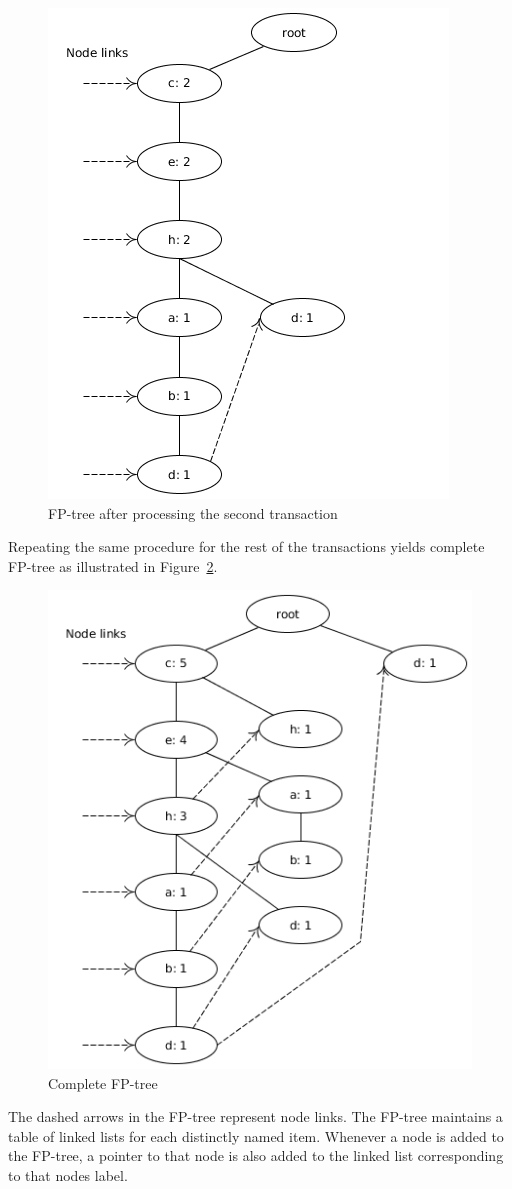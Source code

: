\begin{figure}[!htbp]
	\centering
	\includegraphics[scale=0.5]{fp-tree-example/fp-tree-p2.png}
	\caption{FP-tree after processing the second transaction}
	\label{figure:fp-growth-example2}
\end{figure}

Repeating the same procedure for the rest of the transactions yields complete FP-tree as illustrated in Figure~\ref{figure:fp-growth-example3}.

\begin{figure}[!htbp]
	\centering
	\includegraphics[scale=0.5]{fp-tree-example/fp-tree-p3.png}
	\caption{Complete FP-tree}
	\label{figure:fp-growth-example3}
\end{figure}

The dashed arrows in the FP-tree represent node links. The FP-tree maintains a table of linked lists for each distinctly named item. Whenever a node is added to the FP-tree, a pointer to that node is also added to the linked list corresponding to that nodes label. 